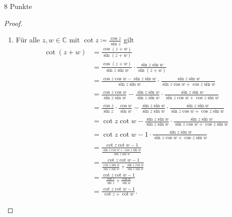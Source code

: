 \documentclass{problemset}
\begin{document}
\begin{problem}{8 Punkte}
\begin{proof}
    \begin{enumerate}
        \item Für alle $z, w \in \mathbb{C}$ mit $\cot z \coloneqq \frac{\cos z}{\sin z}$ gilt
              \begin{align*}
                  \cot (z + w) & = \frac{\cos (z + w)}{\sin (z + w)}                                                                                                                 \\
                               & = \frac{\cos (z + w)}{\sin z \sin w} \cdot \frac{\sin z \sin w}{\sin (z + w)}                                                                       \\
                               & = \frac{\cos z \cos w - \sin z \sin w}{\sin z \sin w} \cdot \frac{\sin z \sin w}{\sin z \cos w + \cos z \sin w}                                     \\
                               & = \frac{\cos z \cos w}{\sin z \sin w} - \frac{\sin z \sin w}{\sin z \sin w} \cdot \frac{\sin z \sin w}{\sin z \cos w + \cos z \sin w}               \\
                               & = \frac{\cos z}{\sin z} \cdot \frac{\cos w}{\sin w} - \frac{\sin z \sin w}{\sin z \sin w} \cdot \frac{\sin z \sin w}{\sin z \cos w + \cos z \sin w} \\
                               & = \cot z \cot w - \frac{\sin z \sin w}{\sin z \sin w} \cdot \frac{\sin z \sin w}{\sin z \cos w + \cos z \sin w}                                     \\
                               & = \cot z \cot w - 1 \cdot \frac{\sin z \sin w}{\sin z \cos w + \cos z \sin w}                                                                       \\
                               & = \frac{\cot z \cot w - 1}{\frac{\sin z \cos w + \cos z \sin w}{\sin z \sin w}}                                                                     \\
                               & = \frac{\cot z \cot w - 1}{\frac{\cos z \sin w}{\sin z \sin w} + \frac{\sin z \cos w}{\sin z \sin w}}                                               \\
                               & = \frac{\cot z \cot w - 1}{\frac{\cos z }{\sin z} + \frac{\cos w}{\sin w}}                                                                          \\
                               & = \frac{\cot z \cot w - 1}{\cot z + \cot w}.
              \end{align*}


\end{enumerate}
\end{proof}
\end{problem}
\end{document}
